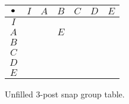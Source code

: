 \documentclass[../gatm.tex]{subfiles}
\begin{document}
\begin{figure}
	\begin{center}
		\centering
		\begin{minipage}[b]{\textwidth}
			\centering
			\begin{tabular}{c|cccccc}
				\hline
				$\bullet$ & $I$ & $A$ & $B$ & $C$ & $D$ & $E$ \\ \hline
				\rowcolor{light-gray}
				$I$    &   &   &   &   &   &   \\ 
				$A$    &   &   & $E$ &   &   &   \\ 
				\rowcolor{light-gray}
				$B$    &   &   &   &   &   &   \\ 
				$C$    &   &   &   &   &   &   \\ 
				\rowcolor{light-gray}
				$D$    &   &   &   &   &   &   \\ 
				$E$    &   &   &   &   &   &   \\ \hline
			\end{tabular}
			\vspace*{0.5\baselineskip}
		\end{minipage}
	\end{center}
	\vspace*{-2\baselineskip}
	\begin{center}
		\begin{minipage}[t]{\textwidth}
			\caption{Unfilled $3$-post snap group table.}
			\label{fig:sbstable}
		\end{minipage}
	\end{center}
\end{figure}
\end{document}
